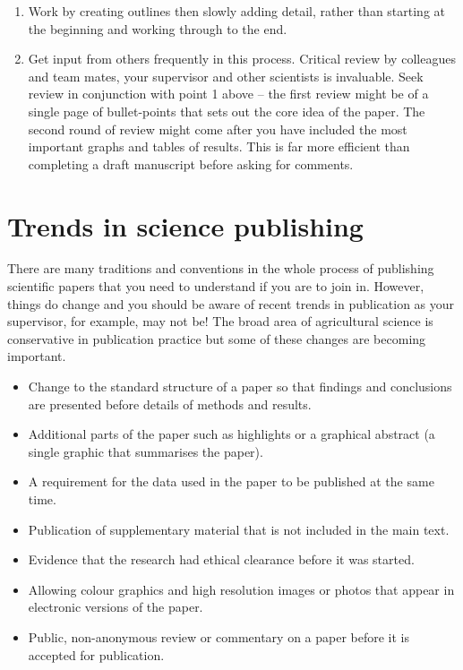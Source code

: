 \documentclass[
]{book}
\begin{document}
\begin{enumerate}
\def\labelenumi{\arabic{enumi}.}
\item
  Work by creating outlines then slowly adding detail, rather than starting at the beginning and working through to the end.
\item
  Get input from others frequently in this process. Critical review by colleagues and team mates, your supervisor and other scientists is invaluable. Seek review in conjunction with point 1 above -- the first review might be of a single page of bullet-points that sets out the core idea of the paper. The second round of review might come after you have included the most important graphs and tables of results. This is far more efficient than completing a draft manuscript before asking for comments.
\end{enumerate}

\hypertarget{trends-in-science-publishing}{%
\section{Trends in science publishing}\label{trends-in-science-publishing}}

There are many traditions and conventions in the whole process of publishing scientific papers that you need to understand if you are to join in. However, things do change and you should be aware of recent trends in publication as your supervisor, for example, may not be! The broad area of agricultural science is conservative in publication practice but some of these changes are becoming important.

\begin{itemize}
\item
  Change to the standard structure of a paper so that findings and conclusions are presented before details of methods and results.
\item
  Additional parts of the paper such as highlights or a graphical abstract (a single graphic that summarises the paper).
\item
  A requirement for the data used in the paper to be published at the same time.
\item
  Publication of supplementary material that is not included in the main text.
\item
  Evidence that the research had ethical clearance before it was started.
\item
  Allowing colour graphics and high resolution images or photos that appear in electronic versions of the paper.
\item
  Public, non-anonymous review or commentary on a paper before it is accepted for publication.
\end{itemize}
\end{document}
